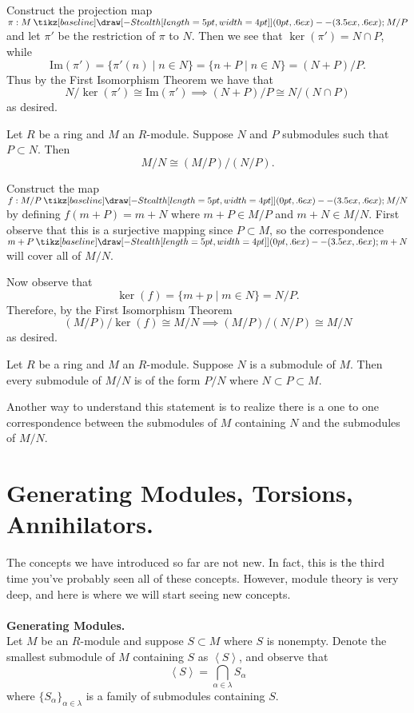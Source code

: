 \documentclass[12pt,letterpaper]{algebra_book}
\renewcommand{\to}{\mathbin{\tikz[baseline] \draw[-{Stealth[length=5pt,width=4pt]}] (0pt,.6ex) -- (3.5ex,.6ex);}}
\newcommand{\im}{\mbox{Im}}
\theoremstyle{definition}
\begin{document}
\begin{prf}
    Construct the projection map $\pi : M \to M/P$ and let $\pi'$
    be the restriction of $\pi$ to $N$. Then we see that
    $\ker(\pi') = N \cap P$, while 
    \[
        \im(\pi') = \{\pi'(n) \mid n \in N\} = \{n + P \mid n \in N\} = (N + P)/P.
    \]
    Thus by the First Isomorphism Theorem we have that 
    \[
        N/\ker(\pi') \cong \im(\pi') \implies (N + P)/P \cong N/(N \cap P)
    \]
    as desired. 
\end{prf}

\begin{thm}
    Let $R$ be a ring and $M$ an $R$-module. Suppose $N$ and $P$
    submodules such that $P \subset N$. Then 
    \[
        M/N \cong (M/P)/(N/P).
    \]
    \vspace{-0.8cm}
\end{thm}

\begin{prf}
    Construct the map $f: M/P \to M/N$ by defining $f(m + P) = m +
    N$ where $m+P \in M/P$ and $m + N \in M/N$. First observe that
    this is a surjective mapping since $P \subset M$, so the
    correspondence $m + P \to m + N$ will cover all of $M/N$. 

    Now observe that 
    \[
        \ker(f) = \{m + p \mid m \in N\} = N/P.
    \]  
    Therefore, by the First Isomorphism Theorem
    \[
        (M/P)/\ker(f) \cong M/N \implies (M/P)/(N/P) \cong M/N
    \]
    as desired.
\end{prf}

\begin{thm}
    Let $R$ be a ring and $M$ an $R$-module. Suppose $N$ is a
    submodule of $M$. Then every submodule of $M/N$ is of
    the form $P/N$ where $N \subset P \subset M$. 
\end{thm}
Another way to understand this statement is to realize there is a
one to one correspondence between the submodules of $M$ containing
$N$ and the submodules of $M/N$.

\begin{prf}
    
\end{prf}


\newpage
\section{Generating Modules, Torsions, Annihilators.}
The concepts we have introduced so far are not new. In fact, this
is the third time you've probably seen all of these concepts.
However, module theory is very deep, and here is where we will
start seeing new concepts. 
\\
\\
\textbf{Generating Modules.}\\
Let $M$ be an $R$-module and suppose $S \subset M$ where $S$ is
nonempty.
Denote the
smallest submodule of $M$ containing $S$ as $\left< S \right>$,
and observe that 
\[
    \left< S \right> = \bigcap_{\alpha \in \lambda} S_{\alpha}
\]
where $\{S_\alpha\}_{\alpha \in \lambda}$ is a family of
submodules containing $S$.
\end{document}
